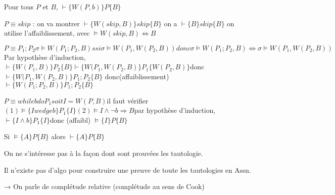 \documentclass[10pt,a4paper]{article}
\newcommand{\semh}[3]{\{#1\}#2\{#3\}}
\begin{document}
\begin{lem}
 Pour tous $P$ et $B$, $\vdash \semh{W(P,b)}{P}{B}$
\end{lem}
\begin{dem}
$P \equiv skip$ : on va montrer $\vdash \semh{W(skip,B)}{skip}{B}$
	on a $\vdash \semh{B}{skip}{B}$
    on utilise l'affaiblissement, avec $\models W(skip,B) \Leftrightarrow B$

$P \equiv P_1; P_2
	\sigma \models W(P_1;P_2,B) ssi \sigma \models W(P_1,W(P_2,B))
      donc \sigma \models W(P_1;P_2,B) \Leftrightarrow \sigma \models W(P_1,W(P_2,B))$
Par hypothèse d'induction, $\vdash \semh{W(P_1,B)}{P_2}{B}
			   \vdash \semh{W(P_1,W(P_2,B)}{P_1}{W(P_2,B)}
	  $donc $\vdash \semh{W(P_1,W(P_2,B)}{P_1;P_2}{B}
	 $ donc(affaiblissement) $\vdash \semh{W(P_1;P_2,B)}{P_1;P_2}{B}$


$P \equiv while b do P_1
      soit I = W(P,B)
       $il faut vérifier $(1) \models \semh{I wedge b}{P_1}{I}
			(2) \models I \wedge \lnot b \Rightarrow B
	$par hypothèse d'induction, $\vdash \semh{I \wedge b}{P_1}{I}
		      $donc (affaibl) $\models \semh{I}{P}{B}
$

\end{dem}
\begin{thm}[de complétude]
 Si $\models \semh{A}{P}{B}$ alors $\vdash \semh{A}{P}{B}$
\end{thm}
\begin{rem}
 On ne s'intéresse pas à la façon dont sont prouvées les tautologie.
\end{rem}
\begin{thm}
 Il n'existe pas d'algo pour construire une preuve de toute les tautologies en Assn.
\end{thm}

→ On parle de complétude relative (complétude au sens de Cook)
\end{document}
